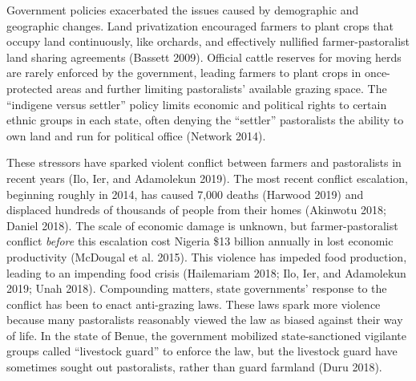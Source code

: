 \documentclass[11pt]{article}
\begin{document}
Government policies exacerbated the issues caused by demographic and
geographic changes. Land privatization encouraged farmers to plant crops
that occupy land continuously, like orchards, and effectively nullified
farmer-pastoralist land sharing agreements (Bassett 2009). Official
cattle reserves for moving herds are rarely enforced by the government,
leading farmers to plant crops in once-protected areas and further
limiting pastoralists' available grazing space. The ``indigene versus
settler'' policy limits economic and political rights to certain ethnic
groups in each state, often denying the ``settler'' pastoralists the
ability to own land and run for political office (Network 2014).

These stressors have sparked violent conflict between farmers and
pastoralists in recent years (Ilo, Ier, and Adamolekun 2019). The most
recent conflict escalation, beginning roughly in 2014, has caused 7,000
deaths (Harwood 2019) and displaced hundreds of thousands of people from
their homes (Akinwotu 2018; Daniel 2018). The scale of economic damage
is unknown, but farmer-pastoralist conflict \emph{before} this
escalation cost Nigeria \$13 billion annually in lost economic
productivity (McDougal et al. 2015). This violence has impeded food
production, leading to an impending food crisis (Hailemariam 2018; Ilo,
Ier, and Adamolekun 2019; Unah 2018). Compounding matters, state
governments' response to the conflict has been to enact anti-grazing
laws. These laws spark more violence because many pastoralists
reasonably viewed the law as biased against their way of life. In the
state of Benue, the government mobilized state-sanctioned vigilante
groups called ``livestock guard'' to enforce the law, but the livestock
guard have sometimes sought out pastoralists, rather than guard farmland
(Duru 2018).
\end{document}
